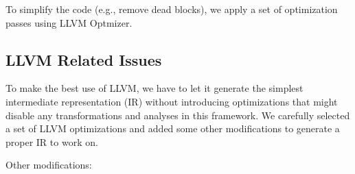 To simplify the code (e.g., remove dead blocks), we apply a set of optimization
passes using LLVM Optmizer.




\subsection{LLVM Related Issues}

To make the best use of LLVM, we have to let it generate the simplest
intermediate representation (IR) without introducing optimizations that might
disable any transformations and analyses in this framework. We carefully
selected a set of LLVM optimizations and added some other modifications to
generate a proper IR to work on.

Other modifications:

